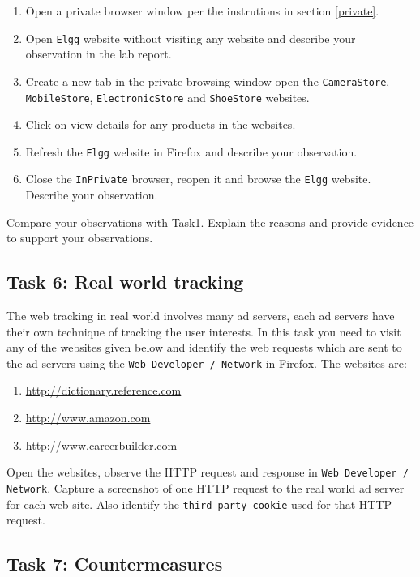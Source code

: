 \begin{enumerate}
  \item Open a private browser window per the instrutions in section \ref{private}.
  \item Open {\tt Elgg} website without visiting any website and describe your observation in the lab report.
  \item Create a new tab in the private browsing window open the {\tt CameraStore}, {\tt MobileStore}, {\tt ElectronicStore} and {\tt ShoeStore} websites.
  \item Click on view details for any products in the websites.
  \item Refresh the {\tt Elgg} website in Firefox and describe your observation.
  \item Close the {\tt InPrivate} browser, reopen it and browse the {\tt Elgg} website. Describe your observation.
\end{enumerate}

Compare your observations with Task1. Explain the reasons and provide evidence to support your observations.


\subsection{Task 6: Real world tracking}

The web tracking in real world involves many ad servers, each ad servers have their own technique of tracking the user interests. 
In this task you need to visit any of the websites given below and identify the web requests which are sent to the ad servers using the {\tt Web Developer / Network} in Firefox.
The websites are:

\begin{enumerate}
  \item \url{http://dictionary.reference.com}
  \item \url{http://www.amazon.com}
  \item \url{http://www.careerbuilder.com}
\end{enumerate}

Open the websites, observe the HTTP request and response in {\tt Web Developer / Network}. 
Capture a screenshot of one HTTP request to the real world ad server for each web site. 
Also identify the {\tt third party cookie} used for that HTTP request.

\subsection{Task 7: Countermeasures}

